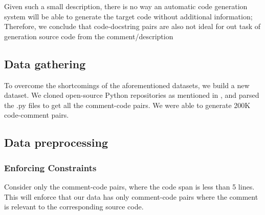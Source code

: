 \documentclass{IEEEtran}
\begin{document}
       Given such a small description, there is no way an automatic code                                                                                           
            generation system will be able to generate the target code without                                                                                          
            additional information; Therefore, we conclude that code-docstring                                                                                          
           pairs are also not ideal for out task of generation source code from the                                                                                         
           comment/description

      \subsection{Data gathering}
        To overcome the shortcomings of the aforementioned datasets, we build a new
        dataset. We cloned open-source Python repositories as mentioned in \cite{barone2017},
        and parsed the .py files to get all the comment-code pairs. We
        were able to generate 200K code-comment pairs.

      \subsection{Data preprocessing}
      \subsubsection{Enforcing Constraints}
        Consider only the comment-code pairs, where the code span is less
        than 5 lines. This will enforce that our data has only comment-code
        pairs where the comment is relevant to the corresponding source code.
\end{document}
